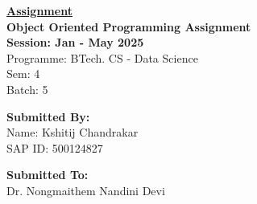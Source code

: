 \documentclass[12pt, letterpaper]{article}
\begin{document}
\centering
{\Huge \underline{\textbf{Assignment}}} \\[0.7cm]
{\Large \textbf{Object Oriented Programming Assignment}} \\[0.5cm]
{\large \textbf{Session: Jan - May 2025}} \\[0.5cm]  %
{\large Programme: BTech. CS - Data Science} \\[0.5cm]  %
{\large Sem: 4} \\  %
{\large Batch: 5}  %

\vfill
\begin{center}
      \begin{minipage}[t][3cm][t]{0.45\textwidth}  %
        \textbf{Submitted By:} \\[0.15cm]
        Name: Kshitij Chandrakar \\
        SAP ID: 500124827
    \end{minipage}
    \hfill
      \begin{minipage}[t][3cm][t]{0.45\textwidth}  %
        \raggedleft  %
        \textbf{Submitted To:} \\[0.15cm]
        Dr. Nongmaithem Nandini Devi
    \end{minipage}
\end{center}
\end{document}
